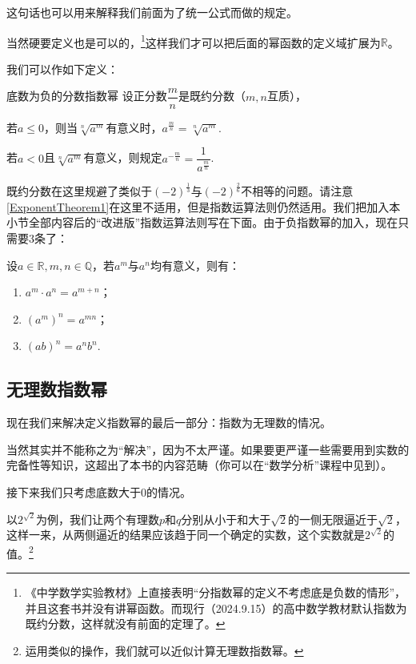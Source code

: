 \documentclass[lang=cn,math=cm,chinesefont=nofont,11pt,scheme=chinese,twocol]{elegantbook}
\begin{document}
这句话也可以用来解释我们前面为了统一公式而做的规定。

当然硬要定义也是可以的，\footnote{《中学数学实验教材》上直接表明“分指数幂的定义不考虑底是负数的情形”，并且这套书并没有讲幂函数。而现行（2024.9.15）的高中数学教材默认指数为既约分数，这样就没有前面的定理了。}这样我们才可以把后面的幂函数的定义域扩展为$\mathbb{R}$。

我们可以作如下定义：

\begin{definition}{底数为负的分数指数幂}
  设正分数$\dfrac{m}{n}$是既约分数（$m,n$互质），
  
  若$a\leqslant 0$，则当$\sqrt[n]{a^m}$有意义时，$a^{\frac{m}{n}}=\sqrt[n]{a^m}$.

  若$a<0$且$\sqrt[n]{a^m}$有意义，则规定$a^{-\frac{m}{n}}=\dfrac{1}{a^\frac{m}{n}}$.
\end{definition}

既约分数在这里规避了类似于$(-2)^\frac{1}{3}$与$(-2)^\frac{2}{6}$不相等的问题。请注意\ref{ExponentTheorem1}在这里不适用，但是指数运算法则仍然适用。我们把加入本小节全部内容后的“改进版”指数运算法则写在下面。由于负指数幂的加入，现在只需要3条了：

\begin{property}\label{LawOfIndices2}
  设$a\in\mathbb{R},m,n\in\mathbb{Q}$，若$a^m$与$a^n$均有意义，则有：
  \begin{enumerate}
    \item $a^m\cdot a^n=a^{m+n}$；
    \item $(a^m)^n=a^{mn}$；
    \item $(ab)^n=a^nb^n$.
    \end{enumerate}
\end{property}

\subsection{无理数指数幂}

现在我们来解决定义指数幂的最后一部分：指数为无理数的情况。

当然其实并不能称之为“解决”，因为不太严谨。如果要更严谨一些需要用到实数的完备性等知识，这超出了本书的内容范畴（你可以在“数学分析”课程中见到）。

接下来我们只考虑底数大于$0$的情况。

以$2^\sqrt{2}$为例，我们让两个有理数$p$和$q$分别从小于和大于$\sqrt{2}$的一侧无限逼近于$\sqrt{2}$，这样一来，从两侧逼近的结果应该趋于同一个确定的实数，这个实数就是$2^\sqrt{2}$的值。\footnote{运用类似的操作，我们就可以近似计算无理数指数幂。}
\end{document}
